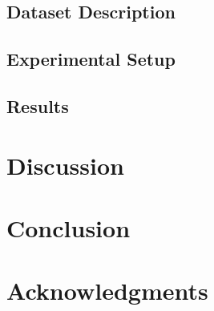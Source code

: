 \documentclass{article}
\begin{document}
\subsection{Dataset Description}


\subsection{Experimental Setup}


\subsection{Results}


\section{Discussion}


\section{Conclusion}


\section*{Acknowledgments}



\end{document}
